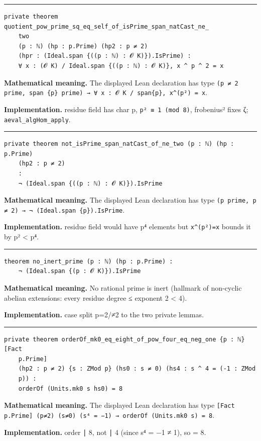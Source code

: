 \documentclass[UTF8,a4paper,11pt,fontset=fandol]{ctexart}
\theoremstyle{definition}
\newcommand{\statementsep}{\par\medskip\hrule\medskip}
\begin{document}
\statementsep
\begin{verbatim}
private theorem quotient_pow_prime_sq_eq_self_of_isPrime_span_natCast_ne_
    two
    (p : ℕ) (hp : p.Prime) (hp2 : p ≠ 2)
    (hpr : (Ideal.span {((p : ℕ) : 𝓞 K)}).IsPrime) :
    ∀ x : (𝓞 K) / Ideal.span {((p : ℕ) : 𝓞 K)}, x ^ p ^ 2 = x
\end{verbatim}
\noindent\textbf{Mathematical meaning.} The displayed Lean declaration has type \texttt{(p ≠ 2 prime, span \{p\} prime) → ∀ x : 𝓞 K / span\{p\}, x\textasciicircum{}(p²) = x}.\par
\noindent\textbf{Implementation.} residue field has char p, \texttt{p² ≡ 1 (mod 8)}, frobenius² fixes ζ; \texttt{aeval\_\allowbreak{}algHom\_\allowbreak{}apply}.\par
\statementsep
\begin{verbatim}
private theorem not_isPrime_span_natCast_of_ne_two (p : ℕ) (hp : p.Prime)
    (hp2 : p ≠ 2)
    :
    ¬ (Ideal.span {((p : ℕ) : 𝓞 K)}).IsPrime
\end{verbatim}
\noindent\textbf{Mathematical meaning.} The displayed Lean declaration has type \texttt{(p prime, p ≠ 2) → ¬ (Ideal.\allowbreak{}span \{p\}).\allowbreak{}IsPrime}.\par
\noindent\textbf{Implementation.} residue field would have p⁴ elements but \texttt{x\textasciicircum{}(p²)=x} bounds it by p² < p⁴.\par
\statementsep
\begin{verbatim}
theorem no_inert_prime (p : ℕ) (hp : p.Prime) :
    ¬ (Ideal.span {(p : 𝓞 K)}).IsPrime
\end{verbatim}
\noindent\textbf{Mathematical meaning.} No rational prime is inert (hallmark of non-cyclic abelian extensions: every residue degree ≤ exponent 2 < 4).\par
\noindent\textbf{Implementation.} case split p=2/≠2 to the two private lemmas.\par
\statementsep
\begin{verbatim}
private theorem orderOf_mk0_eq_eight_of_pow_four_eq_neg_one {p : ℕ} [Fact
    p.Prime]
    (hp2 : p ≠ 2) {s : ZMod p} (hs0 : s ≠ 0) (hs4 : s ^ 4 = (-1 : ZMod
    p)) :
    orderOf (Units.mk0 s hs0) = 8
\end{verbatim}
\noindent\textbf{Mathematical meaning.} The displayed Lean declaration has type \texttt{[Fact p.\allowbreak{}Prime] (p≠2) (s≠0) (s⁴ = −1) → orderOf (Units.\allowbreak{}mk0 s) = 8}.\par
\noindent\textbf{Implementation.} order ∣ 8, not ∣ 4 (since s⁴ = −1 ≠ 1), so = 8.\par
\end{document}

